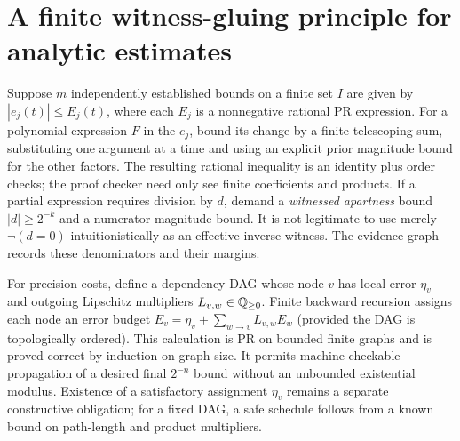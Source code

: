 \documentclass[11pt]{article}
\begin{document}
\section{A finite witness-gluing principle for analytic estimates}
Suppose $m$ independently established bounds on a finite set $I$ are given by $|e_j(t)|\le E_j(t)$, where each $E_j$ is a nonnegative rational PR expression. For a polynomial expression $F$ in the $e_j$, bound its change by a finite telescoping sum, substituting one argument at a time and using an explicit prior magnitude bound for the other factors. The resulting rational inequality is an identity plus order checks; the proof checker need only see finite coefficients and products. If a partial expression requires division by $d$, demand a \emph{witnessed apartness} bound $|d|\ge 2^{-k}$ and a numerator magnitude bound. It is not legitimate to use merely $\neg(d=0)$ intuitionistically as an effective inverse witness. The evidence graph records these denominators and their margins.

For precision costs, define a dependency DAG whose node $v$ has local error $\eta_v$ and outgoing Lipschitz multipliers $L_{v,w}\in\mathbb Q_{\ge0}$. Finite backward recursion assigns each node an error budget $E_v=\eta_v+\sum_{w\to v}L_{v,w}E_w$ (provided the DAG is topologically ordered). This calculation is PR on bounded finite graphs and is proved correct by induction on graph size. It permits machine-checkable propagation of a desired final $2^{-n}$ bound without an unbounded existential modulus. Existence of a satisfactory assignment $\eta_v$ remains a separate constructive obligation; for a fixed DAG, a safe schedule follows from a known bound on path-length and product multipliers.
\end{document}

